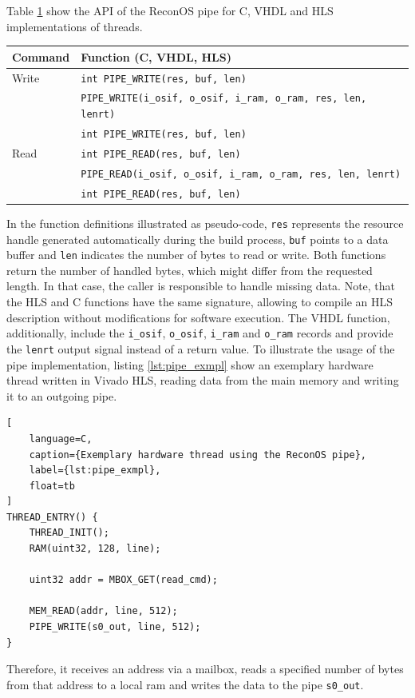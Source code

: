 Table \ref{tab:pipe_api} show the \ac{API} of the ReconOS pipe for C,
\ac{VHDL} and \ac{HLS} implementations of threads.
\begin{table}
	\scriptsize
	\centering
	\label{tab:pipe_api}
	\begin{tabular}{ll}
	\hline
	\textbf{Command} & \textbf{Function (C, \acs{VHDL}, \acs{HLS})}\\
	\hline
	Write & \lstinline{int PIPE_WRITE(res, buf, len)}\\
	& \lstinline{PIPE_WRITE(i_osif, o_osif, i_ram, o_ram, res, len, lenrt)}\\
	& \lstinline{int PIPE_WRITE(res, buf, len)}\\
	\hline
	Read & \lstinline{int PIPE_READ(res, buf, len)}\\
	& \lstinline{PIPE_READ(i_osif, o_osif, i_ram, o_ram, res, len, lenrt)}\\
	& \lstinline{int PIPE_READ(res, buf, len)}\\
	\hline
	\end{tabular}
\end{table}
In the function definitions illustrated as pseudo-code, \lstinline{res}
represents the resource handle generated automatically during the build
process, \lstinline{buf} points to a data buffer and \lstinline{len} indicates
the number of bytes to read or write. Both functions return the number of
handled bytes, which might differ from the requested length. In that case, the
caller is responsible to handle missing data. Note, that the \ac{HLS} and C
functions have the same signature, allowing to compile an \ac{HLS} description
without modifications for software execution. The \ac{VHDL} function,
additionally, include the \lstinline{i_osif}, \lstinline{o_osif},
\lstinline{i_ram} and \lstinline{o_ram} records and provide the
\lstinline{lenrt} output signal instead of a return value. To illustrate the
usage of the pipe implementation, listing \ref{lst:pipe_exmpl} show an
exemplary hardware thread written in Vivado HLS, reading data from the main
memory and writing it to an outgoing pipe.
\begin{lstlisting}[
	language=C,
	caption={Exemplary hardware thread using the ReconOS pipe},
	label={lst:pipe_exmpl},
	float=tb
]
THREAD_ENTRY() {
	THREAD_INIT();
	RAM(uint32, 128, line);

	uint32 addr = MBOX_GET(read_cmd);

	MEM_READ(addr, line, 512);
	PIPE_WRITE(s0_out, line, 512);
}
\end{lstlisting}
Therefore, it receives an address via a mailbox, reads a specified number of
bytes from that address to a local ram and writes the data to the pipe
\lstinline{s0_out}.

